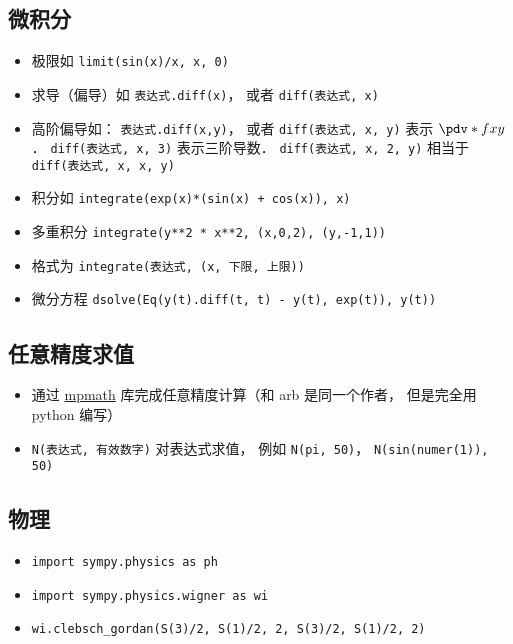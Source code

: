 \subsection{微积分}
\begin{itemize}
\item 极限如 \verb|limit(sin(x)/x, x, 0)|
\item 求导（偏导）如 \verb|表达式.diff(x)|， 或者 \verb|diff(表达式, x)|
\item 高阶偏导如： \verb|表达式.diff(x,y)|， 或者 \verb|diff(表达式, x, y)| 表示 $\pdv*{f}{x}{y}$． \verb|diff(表达式, x, 3)| 表示三阶导数． \verb|diff(表达式, x, 2, y)| 相当于 \verb|diff(表达式, x, x, y)|
\item 积分如 \verb|integrate(exp(x)*(sin(x) + cos(x)), x)|
\item 多重积分 \verb|integrate(y**2 * x**2, (x,0,2), (y,-1,1))|
\item 格式为 \verb|integrate(表达式, (x, 下限, 上限))|
\item 微分方程 \verb|dsolve(Eq(y(t).diff(t, t) - y(t), exp(t)), y(t))|
\end{itemize}


\subsection{任意精度求值}
\begin{itemize}
\item 通过 \href{https://mpmath.org/}{mpmath} 库完成任意精度计算（和 arb 是同一个作者， 但是完全用 python 编写）
\item \verb|N(表达式, 有效数字)| 对表达式求值， 例如 \verb|N(pi, 50)|， \verb|N(sin(numer(1)), 50)|
\end{itemize}

\subsection{物理}
\begin{itemize}
\item \verb|import sympy.physics as ph|
\item \verb|import sympy.physics.wigner as wi|
\item \verb|wi.clebsch_gordan(S(3)/2, S(1)/2, 2, S(3)/2, S(1)/2, 2)|
\end{itemize}
